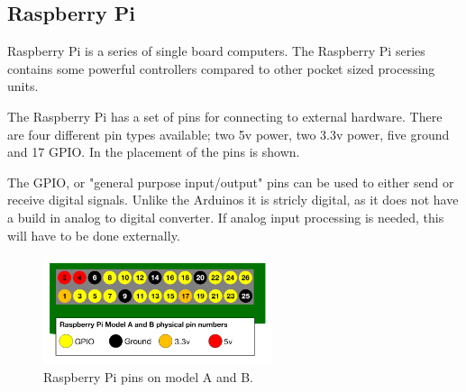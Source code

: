 \subsection{Raspberry Pi}
Raspberry Pi is a series of single board computers. The Raspberry Pi series contains some powerful controllers compared to other pocket sized processing units.

The Raspberry Pi has a set of pins for connecting to external hardware. There are four different pin types available; two 5v power, two 3.3v power, five ground and 17 GPIO. In  the placement of the pins is shown. 

The GPIO, or "general purpose input/output" pins can be used to either send or receive digital signals. Unlike the Arduinos it is stricly digital, as it does not have a build in analog to digital converter. If analog input processing is needed, this will have to be done externally.

\begin{figure}[H]
\centering
\includegraphics[width=0.6\textwidth]{chapters/analysis/figs/rpiABPins.png}
\caption{Raspberry Pi pins on model A and B.}
\label{fig:abPins}
\end{figure}

